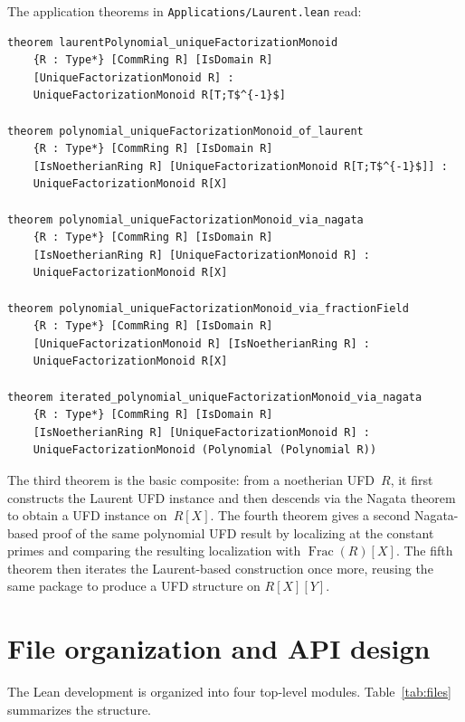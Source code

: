 \documentclass[11pt]{article}
\theoremstyle{plain}
\theoremstyle{definition}
\theoremstyle{remark}
\newcommand{\lf}[1]{\texorpdfstring{\nolinkurl{#1}}{#1}}
\begin{document}
The application theorems in \lf{Applications/Laurent.lean} read:

\begin{lstlisting}[style=lean]
theorem laurentPolynomial_uniqueFactorizationMonoid
    {R : Type*} [CommRing R] [IsDomain R]
    [UniqueFactorizationMonoid R] :
    UniqueFactorizationMonoid R[T;T$^{-1}$]

theorem polynomial_uniqueFactorizationMonoid_of_laurent
    {R : Type*} [CommRing R] [IsDomain R]
    [IsNoetherianRing R] [UniqueFactorizationMonoid R[T;T$^{-1}$]] :
    UniqueFactorizationMonoid R[X]

theorem polynomial_uniqueFactorizationMonoid_via_nagata
    {R : Type*} [CommRing R] [IsDomain R]
    [IsNoetherianRing R] [UniqueFactorizationMonoid R] :
    UniqueFactorizationMonoid R[X]

theorem polynomial_uniqueFactorizationMonoid_via_fractionField
    {R : Type*} [CommRing R] [IsDomain R]
    [UniqueFactorizationMonoid R] [IsNoetherianRing R] :
    UniqueFactorizationMonoid R[X]

theorem iterated_polynomial_uniqueFactorizationMonoid_via_nagata
    {R : Type*} [CommRing R] [IsDomain R]
    [IsNoetherianRing R] [UniqueFactorizationMonoid R] :
    UniqueFactorizationMonoid (Polynomial (Polynomial R))
\end{lstlisting}

\noindent
The third theorem is the basic composite: from a noetherian UFD~$R$, it first
constructs the Laurent UFD instance and then descends via the Nagata theorem
to obtain a UFD instance on~$R[X]$.  The fourth theorem gives a second
Nagata-based proof of the same polynomial UFD result by localizing at the
constant primes and comparing the resulting localization with
$\operatorname{Frac}(R)[X]$.  The fifth theorem then iterates the Laurent-based
construction once more, reusing the same package to produce a UFD structure on
$R[X][Y]$.


\section{File organization and API design}\label{sec:organization}

The Lean development is organized into four top-level modules.
Table~\ref{tab:files} summarizes the structure.
\end{document}
